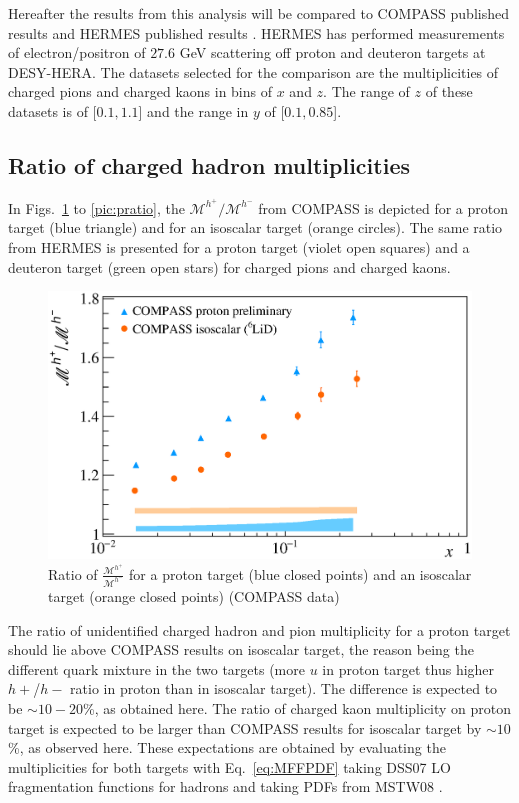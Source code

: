 Hereafter the results from this analysis will be compared to COMPASS published results and HERMES published results \cite{HERMESMult}. HERMES has performed measurements of electron/positron of $27.6$ GeV scattering off proton and deuteron targets at DESY-HERA. The datasets selected for the comparison are the multiplicities of charged pions and charged kaons in bins of $x$ and $z$. The range of $z$ of these datasets is of [$0.1,1.1$] and the range in $y$ of [$0.1,0.85$].

\subsection{Ratio of charged hadron multiplicities}

In Figs.~\ref{pic:hratio} to \ref{pic:pratio}, the $\mathscr{M}^{h^+}/\mathscr{M}^{h^-}$ from COMPASS is depicted for a proton target (blue triangle) and for an isoscalar target (orange circles). The same ratio from HERMES is presented for a proton target (violet open squares) and a deuteron target (green open stars) for charged pions and charged kaons.

\begin{figure}[!h]
  \centering
	\includegraphics[scale=0.5]{./gfx/Mult_h_ratio.eps}
	\caption{Ratio of $\frac{\mathscr{M}^{h^+}}{\mathscr{M}^{h^-}}$ for a proton target (blue closed points) and an isoscalar target (orange closed points) (COMPASS data)}
	\label{pic:hratio}
\end{figure}

The ratio of unidentified charged hadron and pion multiplicity for a proton target should lie above COMPASS results on isoscalar target, the reason being the different quark mixture in the two targets (more $u$ in proton target thus higher $h+$/$h-$ ratio in proton than in isoscalar target). The difference is expected to be $\sim$$10-20$\%, as obtained here. The ratio of charged kaon multiplicity on proton target is expected to be larger than COMPASS results for isoscalar target by $\sim$$10$\%, as observed here. These expectations are obtained by evaluating the multiplicities for both targets with Eq.~\ref{eq:MFFPDF} taking DSS07 \cite{DSS07} LO fragmentation functions for hadrons and taking PDFs from MSTW08 \cite{MSTW08}.

